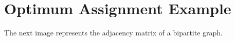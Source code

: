 ﻿\chapter{Optimum Assignment Example}

    The next image represents the adjacency matrix of a bipartite graph.